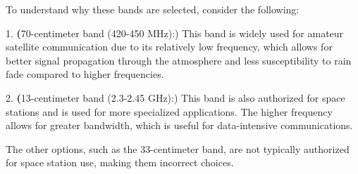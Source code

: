 To understand why these bands are selected, consider the following:

1. \textbf(70-centimeter band (420-450 MHz):) This band is widely used for amateur satellite communication due to its relatively low frequency, which allows for better signal propagation through the atmosphere and less susceptibility to rain fade compared to higher frequencies.

2. \textbf(13-centimeter band (2.3-2.45 GHz):) This band is also authorized for space stations and is used for more specialized applications. The higher frequency allows for greater bandwidth, which is useful for data-intensive communications.

The other options, such as the 33-centimeter band, are not typically authorized for space station use, making them incorrect choices.

